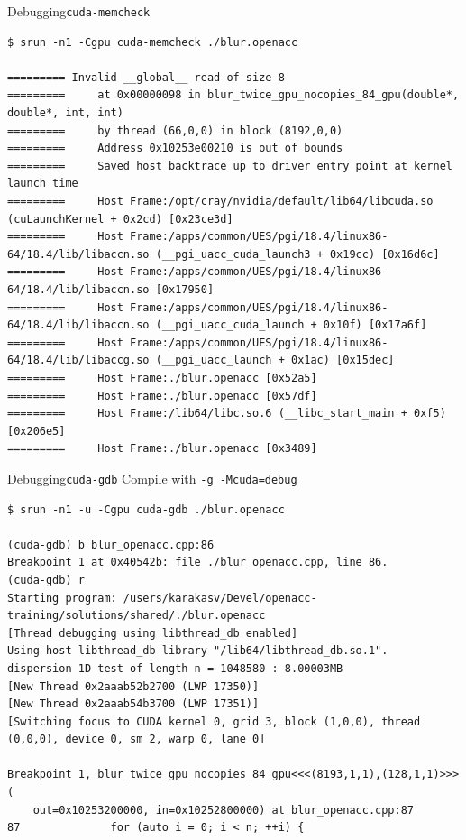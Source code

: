 \documentclass[aspectratio=169,12pt]{beamer}
\begin{document}
\begin{frame}[fragile]{Debugging}{\texttt{cuda-memcheck}}
  \begin{lstlisting}[basicstyle=\ttfamily\tiny]
$ srun -n1 -Cgpu cuda-memcheck ./blur.openacc

========= Invalid __global__ read of size 8
=========     at 0x00000098 in blur_twice_gpu_nocopies_84_gpu(double*, double*, int, int)
=========     by thread (66,0,0) in block (8192,0,0)
=========     Address 0x10253e00210 is out of bounds
=========     Saved host backtrace up to driver entry point at kernel launch time
=========     Host Frame:/opt/cray/nvidia/default/lib64/libcuda.so (cuLaunchKernel + 0x2cd) [0x23ce3d]
=========     Host Frame:/apps/common/UES/pgi/18.4/linux86-64/18.4/lib/libaccn.so (__pgi_uacc_cuda_launch3 + 0x19cc) [0x16d6c]
=========     Host Frame:/apps/common/UES/pgi/18.4/linux86-64/18.4/lib/libaccn.so [0x17950]
=========     Host Frame:/apps/common/UES/pgi/18.4/linux86-64/18.4/lib/libaccn.so (__pgi_uacc_cuda_launch + 0x10f) [0x17a6f]
=========     Host Frame:/apps/common/UES/pgi/18.4/linux86-64/18.4/lib/libaccg.so (__pgi_uacc_launch + 0x1ac) [0x15dec]
=========     Host Frame:./blur.openacc [0x52a5]
=========     Host Frame:./blur.openacc [0x57df]
=========     Host Frame:/lib64/libc.so.6 (__libc_start_main + 0xf5) [0x206e5]
=========     Host Frame:./blur.openacc [0x3489]
  \end{lstlisting}
\end{frame}

\begin{frame}[fragile]{Debugging}{\texttt{cuda-gdb}}
  \small Compile with \texttt{-g -Mcuda=debug}
  \vfill
  \begin{lstlisting}[basicstyle=\ttfamily\tiny]
$ srun -n1 -u -Cgpu cuda-gdb ./blur.openacc

(cuda-gdb) b blur_openacc.cpp:86
Breakpoint 1 at 0x40542b: file ./blur_openacc.cpp, line 86.
(cuda-gdb) r
Starting program: /users/karakasv/Devel/openacc-training/solutions/shared/./blur.openacc
[Thread debugging using libthread_db enabled]
Using host libthread_db library "/lib64/libthread_db.so.1".
dispersion 1D test of length n = 1048580 : 8.00003MB
[New Thread 0x2aaab52b2700 (LWP 17350)]
[New Thread 0x2aaab54b3700 (LWP 17351)]
[Switching focus to CUDA kernel 0, grid 3, block (1,0,0), thread (0,0,0), device 0, sm 2, warp 0, lane 0]

Breakpoint 1, blur_twice_gpu_nocopies_84_gpu<<<(8193,1,1),(128,1,1)>>> (
    out=0x10253200000, in=0x10252800000) at blur_openacc.cpp:87
87              for (auto i = 0; i < n; ++i) {
  \end{lstlisting}
\end{frame}
\end{document}

